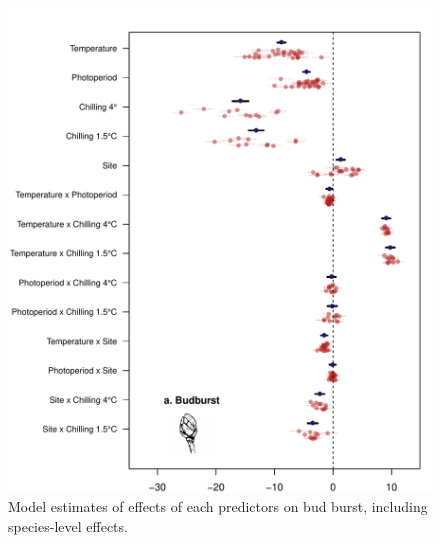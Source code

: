 \documentclass{article}
\begin{document}
\begin{figure}
\caption{Model estimates of effects of each predictors on bud burst, including species-level effects.}
\label{figS2}
\includegraphics[scale=0.75, page=1]{Fig1_bb_lo+sp} %
\end{figure}

\clearpage
\end{document}
